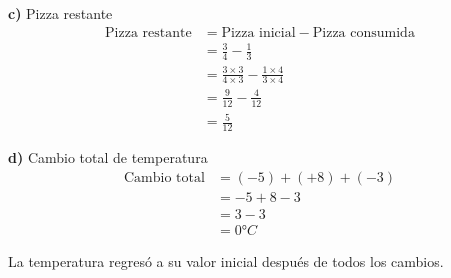 \textbf{c)} Pizza restante
\begin{align}
\text{Pizza restante} &= \text{Pizza inicial} - \text{Pizza consumida}\\
&= \frac{3}{4} - \frac{1}{3}\\
&= \frac{3 \times 3}{4 \times 3} - \frac{1 \times 4}{3 \times 4}\\
&= \frac{9}{12} - \frac{4}{12}\\
&= \frac{5}{12}
\end{align}

\textbf{d)} Cambio total de temperatura
\begin{align}
\text{Cambio total} &= (-5) + (+8) + (-3)\\
&= -5 + 8 - 3\\
&= 3 - 3\\
&= 0°C
\end{align}

La temperatura regresó a su valor inicial después de todos los cambios.